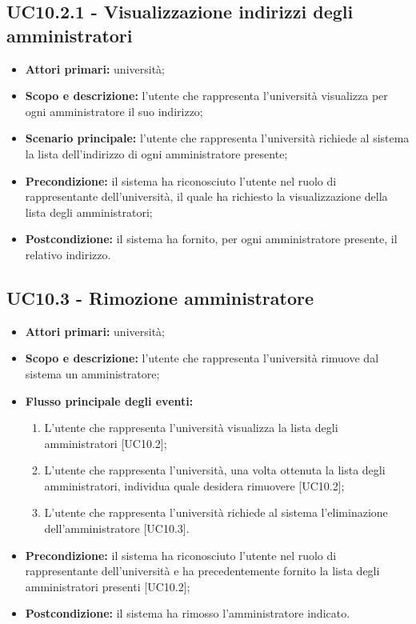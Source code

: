 \documentclass[AnalisiDeiRequisiti.tex]{subfiles}
\begin{document}
\subsection{UC10.2.1 - Visualizzazione indirizzi degli amministratori}
\begin{itemize}
	\item \textbf{Attori primari:} università;
	\item \textbf{Scopo e descrizione:} l'utente che rappresenta l'università visualizza per ogni amministratore il suo indirizzo;
	\item \textbf{Scenario principale:} l'utente che rappresenta l'università richiede al sistema la lista dell'indirizzo di ogni amministratore presente;
	\item \textbf{Precondizione:} il sistema ha riconosciuto l'utente nel ruolo di rappresentante dell'università, il quale ha richiesto la visualizzazione della lista degli amministratori;
	\item \textbf{Postcondizione:} il sistema ha fornito, per ogni amministratore presente, il relativo indirizzo.
\end{itemize}
\subsection{UC10.3 - Rimozione amministratore}
\begin{itemize}
	\item \textbf{Attori primari:} università;
	\item \textbf{Scopo e descrizione:} l'utente che rappresenta l'università rimuove dal sistema un amministratore;
	\item \textbf{Flusso principale degli eventi:}
	\begin{enumerate}
		\item L'utente che rappresenta l'università  visualizza la lista degli amministratori [UC10.2];
		\item L'utente che rappresenta l'università, una volta ottenuta la lista degli amministratori, individua quale desidera rimuovere [UC10.2];
		\item L'utente che rappresenta l'università richiede al sistema l'eliminazione dell'amministratore [UC10.3].
	\end{enumerate}
	\item \textbf{Precondizione:} il sistema ha riconosciuto l'utente nel ruolo di rappresentante dell'università e ha precedentemente fornito la lista degli amministratori presenti [UC10.2]; 
	\item \textbf{Postcondizione:} il sistema ha rimosso l'amministratore indicato.
\end{itemize}
\end{document}
